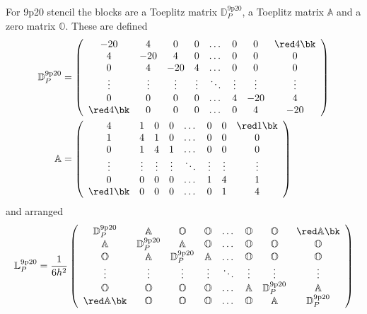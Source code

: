 For 9p20 stencil the blocks are a Toeplitz matrix $\mathbb{D}^{\mathrm{9p20}}_P$, a Toeplitz matrix $\mathbb{A}$ and a zero matrix $\mathbb{O}$. These are defined
\begin{align}
	\mathbb{D}^{\mathrm{9p20}}_P &= \left(\begin{array}{ccccccccc}
		-20 & 4 & 0&0& \dots&0&0 &\red 4\bk\\
		4&-20&4&0&\dots&0&0& 0\\
		0&4&-20&4 &\dots&0&0&0\\
		\vdots&\vdots&\vdots&\vdots&\ddots &\vdots&\vdots&\vdots\\
		0&0&0&0&\dots &4&-20&4 \\
		\red 4\bk&0&0&0&\dots &0&4&-20
	\end{array}\right) \\
	\mathbb{A} &= \left(\begin{array}{ccccccccc}
		4 & 1 & 0&0& \dots&0&0 &\red 1\bk\\
		1&4&1&0&\dots&0&0& 0\\
		0&1&4&1 &\dots&0&0&0\\
		\vdots&\vdots&\vdots&\vdots&\ddots &\vdots&\vdots&\vdots\\
		0&0&0&0&\dots &1&4&1 \\
		\red 1\bk&0&0&0&\dots &0&1&4
	\end{array}\right)
\end{align}
and arranged 
\begin{equation}
	\mathbb{L}^{\mathrm{9p20}}_P = \frac{1}{6h^2}\left(\begin{array}{cccccccccc}
		\mathbb{D}^\mathrm{9p20}_P & \mathbb{A} & \mathbb{O}&\mathbb{O}& \dots&\mathbb{O}&\mathbb{O} &\red \mathbb{A}\bk\\
		\mathbb{A}&\mathbb{D}^\mathrm{9p20}_P & \mathbb{A} & \mathbb{O}& \dots&\mathbb{O}&\mathbb{O}&\mathbb{O}\\
		\mathbb{O}&\mathbb{A}&\mathbb{D}^\mathrm{9p20}_P & \mathbb{A} &  \dots&\mathbb{O}&\mathbb{O}&\mathbb{O}\\
		\vdots&\vdots&\vdots&\vdots&\ddots &\vdots&\vdots&\vdots\\
		\mathbb{O}&\mathbb{O}&\mathbb{O}&\mathbb{O}&\dots &\mathbb{A}&\mathbb{D}^\mathrm{9p20}_P & \mathbb{A} \\
		\red \mathbb{A}\bk&\mathbb{O}&\mathbb{O}&\mathbb{O}&\dots &\mathbb{O}&\mathbb{A}&\mathbb{D}^\mathrm{9p20}_P
	\end{array}\right)
\end{equation}

